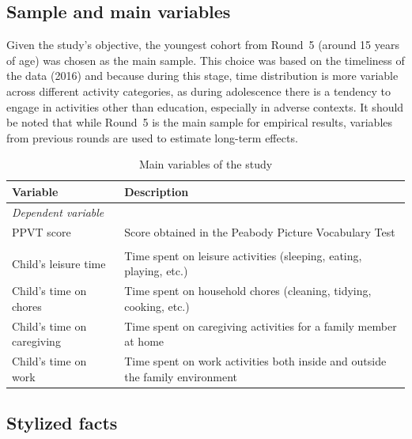 \documentclass[12pt]{article}
\begin{document}
\subsection{Sample and main variables}
\label{subsec:sample}

Given the study's objective, the youngest cohort from Round~5 (around 15 years
of age) was chosen as the main sample. This choice was based on the timeliness
of the data (2016) and because during this stage, time distribution is more
variable across different activity categories, as during adolescence there is
a tendency to engage in activities other than education, especially in adverse
contexts. It should be noted that while Round~5 is the main sample for
empirical results, variables from previous rounds are used to estimate
long-term effects.

\begin{table}[ht]
\centering
\caption{Main variables of the study}
\label{tab:mainvars}
\begin{tabular}{lp{9cm}}
\toprule
\textbf{Variable} & \textbf{Description} \\
\midrule
\multicolumn{2}{l}{\textit{Dependent variable}} \\
PPVT score & Score obtained in the Peabody Picture Vocabulary Test \\
\addlinespace
\multicolumn{2}{l}{\textit{Main independent variables}} \\
Child's leisure time       & Time spent on leisure activities (sleeping, eating, playing, etc.) \\
Child's time on chores     & Time spent on household chores (cleaning, tidying, cooking, etc.) \\
Child's time on caregiving & Time spent on caregiving activities for a family member at home \\
Child's time on work       & Time spent on work activities both inside and outside the family environment \\
\bottomrule
\end{tabular}
\end{table}

\subsection{Stylized facts}
\label{subsec:stylizedfacts}
\end{document}

